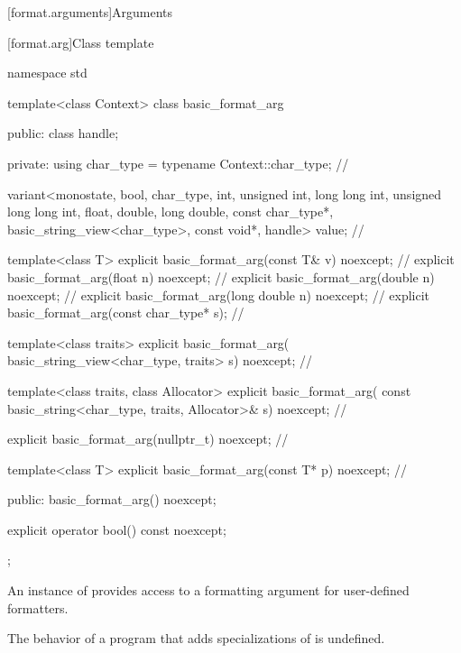 [format.arguments]{Arguments}

[format.arg]{Class template }

%
\begin{codeblock}
namespace std {
  template<class Context>
  class basic_format_arg {
  public:
    class handle;

  private:
    using char_type = typename Context::char_type;                              // \expos

    variant<monostate, bool, char_type,
            int, unsigned int, long long int, unsigned long long int,
            float, double, long double,
            const char_type*, basic_string_view<char_type>,
            const void*, handle> value;                                         // \expos

    template<class T> explicit basic_format_arg(const T& v) noexcept;           // \expos
    explicit basic_format_arg(float n) noexcept;                                // \expos
    explicit basic_format_arg(double n) noexcept;                               // \expos
    explicit basic_format_arg(long double n) noexcept;                          // \expos
    explicit basic_format_arg(const char_type* s);                              // \expos

    template<class traits>
      explicit basic_format_arg(
        basic_string_view<char_type, traits> s) noexcept;                       // \expos

    template<class traits, class Allocator>
      explicit basic_format_arg(
        const basic_string<char_type, traits, Allocator>& s) noexcept;          // \expos

    explicit basic_format_arg(nullptr_t) noexcept;                              // \expos

    template<class T>
      explicit basic_format_arg(const T* p) noexcept;                           // \expos

  public:
    basic_format_arg() noexcept;

    explicit operator bool() const noexcept;
  };
}
\end{codeblock}

\pnum
An instance of  provides access to
a formatting argument for user-defined formatters.

\pnum
The behavior of a program that adds specializations of
 is undefined.


